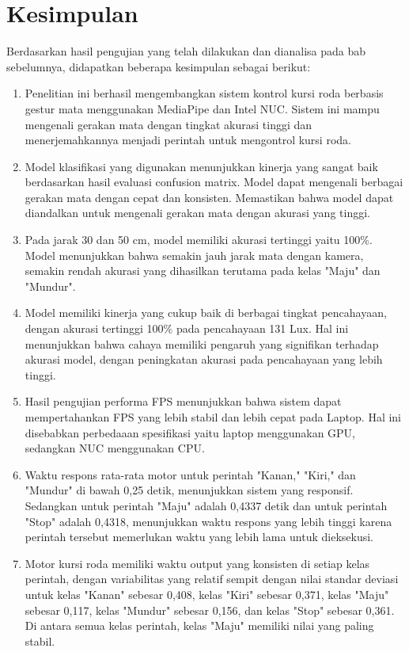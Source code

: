 \section{Kesimpulan}
\label{sec:kesimpulan}


Berdasarkan hasil pengujian yang telah dilakukan dan dianalisa pada bab sebelumnya, didapatkan beberapa kesimpulan sebagai berikut:

\begin{enumerate}

  \item Penelitian ini berhasil mengembangkan sistem kontrol kursi roda berbasis gestur mata menggunakan MediaPipe dan Intel NUC. Sistem ini mampu mengenali gerakan mata dengan tingkat akurasi tinggi dan menerjemahkannya menjadi perintah untuk mengontrol kursi roda.

  \item Model klasifikasi yang digunakan menunjukkan kinerja yang sangat baik berdasarkan hasil evaluasi confusion matrix. Model dapat mengenali berbagai gerakan mata dengan cepat dan konsisten. Memastikan bahwa model dapat diandalkan untuk mengenali gerakan mata dengan akurasi yang tinggi.

  \item Pada jarak 30 dan 50 cm, model memiliki akurasi tertinggi yaitu 100\%. Model menunjukkan bahwa semakin jauh jarak mata dengan kamera, semakin rendah akurasi yang dihasilkan terutama pada kelas "Maju" dan "Mundur".

  \item Model memiliki kinerja yang cukup baik di berbagai tingkat pencahayaan, dengan akurasi tertinggi 100\% pada pencahayaan 131 Lux. Hal ini menunjukkan bahwa cahaya memiliki pengaruh yang signifikan terhadap akurasi model, dengan peningkatan akurasi pada pencahayaan yang lebih tinggi. 

  \item Hasil pengujian performa FPS menunjukkan bahwa sistem dapat mempertahankan FPS yang lebih stabil dan lebih cepat pada Laptop. Hal ini disebabkan perbedaaan spesifikasi yaitu laptop menggunakan GPU, sedangkan NUC menggunakan CPU.
  
  \item Waktu respons rata-rata motor untuk perintah "Kanan," "Kiri," dan "Mundur" di bawah 0,25 detik, menunjukkan sistem yang responsif. Sedangkan untuk perintah "Maju" adalah 0,4337 detik dan untuk perintah "Stop" adalah 0,4318, menunjukkan waktu respons yang lebih tinggi karena perintah tersebut memerlukan waktu yang lebih lama untuk dieksekusi.
  
  \item Motor kursi roda memiliki waktu output yang konsisten di setiap kelas perintah, dengan variabilitas yang relatif sempit dengan nilai standar deviasi untuk kelas "Kanan" sebesar 0,408, kelas "Kiri" sebesar 0,371, kelas "Maju" sebesar 0,117, kelas "Mundur" sebesar 0,156, dan kelas "Stop" sebesar 0,361. Di antara semua kelas perintah, kelas "Maju" memiliki nilai yang paling stabil.

\end{enumerate}